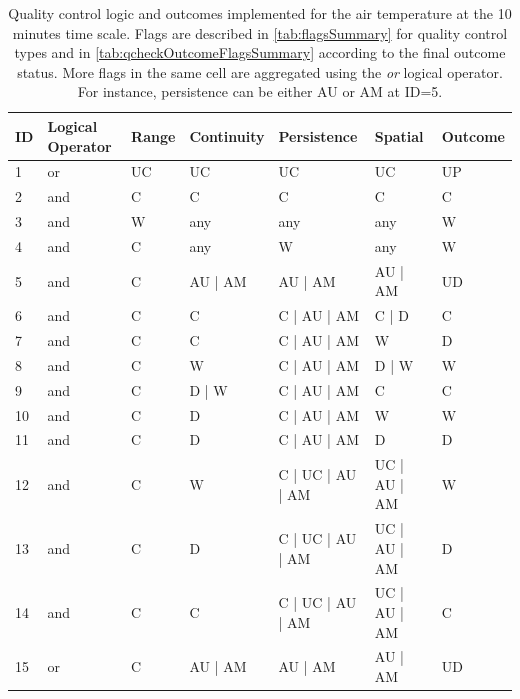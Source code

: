\documentclass[authoryear,preprint,review,12pt]{elsarticle}
\begin{document}
\begin{table}[]
    \begin{scriptsize}
    \centering
    \begin{tabular}{l l l l l l l}
        \hline
        ID & Logical Operator & Range & Continuity & Persistence      & Spatial      & Outcome \\
        \hline
        1  & or               & UC    & UC         & UC               & UC           & UP \\
        2  & and              & C     & C          & C                & C            & C  \\
        3  & and              & W     & any        & any              & any          & W  \\
        4  & and              & C     & any        & W                & any          & W  \\
        5  & and              & C     & AU | AM    & AU | AM          & AU | AM      & UD \\
        6  & and              & C     & C          & C | AU | AM      & C | D        & C  \\
        7  & and              & C     & C          & C | AU | AM      & W            & D  \\
        8  & and              & C     & W          & C | AU | AM      & D | W        & W  \\
        9  & and              & C     & D | W      & C | AU | AM      & C            & C  \\
        10 & and              & C     & D          & C | AU | AM      & W            & W  \\
        11 & and              & C     & D          & C | AU | AM      & D            & D  \\
        12 & and              & C     & W          & C | UC | AU | AM & UC | AU | AM & W  \\
        13 & and              & C     & D          & C | UC | AU | AM & UC | AU | AM & D  \\
        14 & and              & C     & C          & C | UC | AU | AM & UC | AU | AM & C  \\
        15 & or               & C     & AU | AM    & AU | AM          & AU | AM      & UD \\
        \hline
    \end{tabular}
    \end{scriptsize}
    \caption{Quality control logic and outcomes implemented for the air temperature at the 10 minutes time scale.
    Flags are described in \cref{tab:flagsSummary} for quality control types and in \cref{tab:qcheckOutcomeFlagsSummary} according to the final outcome status.
    More flags in the same cell are aggregated using the \textit{or} logical operator.
    For instance, persistence can be either AU or AM at ID=5. }
    \label{tab:qcheck_m10_airT}
\end{table}
\end{document}
